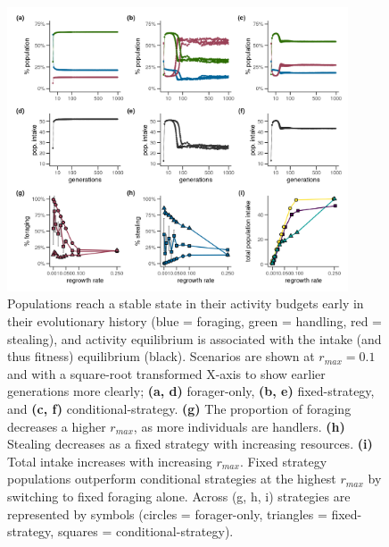 \documentclass[11pt]{article}
\begin{document}
\begin{figure}[h!]
    \centering
    \includegraphics[width=0.90\textwidth]{figures/fig_02_equilibrium.png}
    \caption{Populations reach a stable state in their activity budgets early in their evolutionary history (blue = foraging, green = handling, red = stealing), and 
    activity equilibrium is associated with the intake (and thus fitness) equilibrium (black). Scenarios are shown at $r_{max} = 0.1$ and with a square-root transformed X-axis to show earlier generations more clearly; \textbf{(a, d)} forager-only, \textbf{(b, e)} fixed-strategy, and \textbf{(c, f)} conditional-strategy.
    \textbf{(g)} The proportion of foraging decreases a higher $r_{max}$, as more individuals are handlers.
    \textbf{(h)} Stealing decreases as a fixed strategy with increasing resources.
    \textbf{(i)} Total intake increases with increasing $r_{max}$. Fixed strategy populations outperform conditional strategies at the highest $r_{max}$ by switching to fixed foraging alone.
    Across (g, h, i) strategies are represented by symbols (circles = forager-only, triangles = fixed-strategy, squares = conditional-strategy). 
    }
    \label{Fig:EcologicalEquilibrium}
\end{figure}
\end{document}
